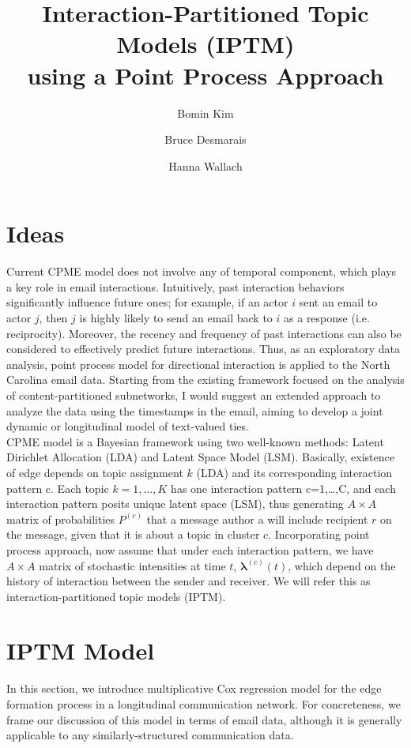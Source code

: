 \documentclass[a4paper]{article}
\title{Interaction-Partitioned Topic Models (IPTM) \\using a Point Process Approach}
\author[1]{Bomin Kim}
\author[1]{Bruce Desmarais}
\author[2,3]{Hanna Wallach}
\affil[1]{Pennsylvania State University}
\affil[2]{Microsoft Research NYC}
\affil[3]{University of Massachusetts Amherst}
\begin{document}
\maketitle
\section{Ideas}
Current CPME model does not involve any of temporal component, which plays a key role in email interactions. Intuitively, past interaction behaviors significantly influence future ones; for example, if an actor $i$ sent an email to actor $j$, then $j$ is highly likely to send an email back to $i$ as a response (i.e. reciprocity). Moreover, the recency and frequency of past interactions can also be considered to effectively predict future interactions. Thus, as an exploratory data analysis, point process model for directional interaction is applied to the North Carolina email data. Starting from the existing framework focused on the analysis of content-partitioned subnetworks, I would suggest an extended approach to analyze the data using the timestamps in the email, aiming to develop a joint dynamic or longitudinal model of text-valued ties.\\ \newline
 CPME model is a Bayesian framework using two well-known methods: Latent Dirichlet Allocation (LDA) and Latent Space Model (LSM). Basically, existence of edge depends on topic assignment $k$ (LDA) and its corresponding interaction pattern c. Each topic $k=1,…,K$ has one interaction pattern c=1,…,C, and each interaction pattern posits unique latent space (LSM), thus generating $A\times A$ matrix of probabilities $P^{(c)}$ that a message author
a will include recipient $r$ on the message, given that it is about
a topic in cluster $c$.  Incorporating point process approach, now assume that under each interaction pattern, we have $A\times A$ matrix of stochastic intensities at time $t$, $\boldsymbol{\lambda}^{(c)}(t)$, which depend on the history of interaction between the sender and receiver. We will refer this as  interaction-partitioned topic models (IPTM). 
\section{IPTM Model}
In this section, we introduce multiplicative Cox regression model for the edge formation process in a longitudinal communication network. For concreteness, we frame our discussion of this model in terms of email data, although it is generally applicable to any similarly-structured communication data.
\end{document}
